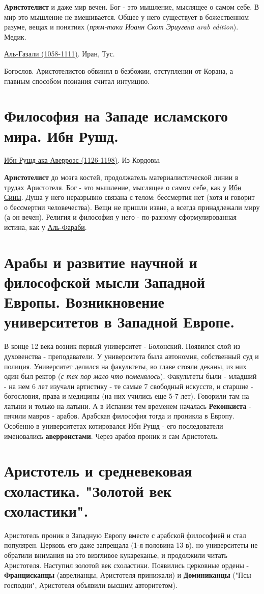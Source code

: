 \documentclass[12pt,a4paper]{article}
\begin{document}
\textbf{Аристотелист} и даже мир вечен. Бог - это мышление, мыслящее о самом себе. В мир это мышление не вмешивается.
Общее у него существует в божественном разуме, вещах и понятиях (\textit{прям-таки Иоанн Скот Эриугена arab edition}). Медик.

\underline{Аль-Газали (1058-1111)}. Иран, Тус.

Богослов. Аристотелистов обвинял в безбожии, отступлении от Корана, а главным способом познания считал интуицию. 

\section{Философия на Западе исламского мира. Ибн Рушд.}

\underline{Ибн Рушд ака Аверроэс (1126-1198)}. Из Кордовы.

\textbf{Аристотелист} до мозга костей, продолжатель материалистической линии в трудах Аристотеля. Бог - это мышление, мыслящее о самом себе, как у \underline{Ибн Сины}. Душа у него неразрывно связана с телом: бессмертия нет (хотя и говорит о бессмертии человечества). Вещи не пришли извне, а всегда принадлежали миру (а он вечен). Религия и философия у него - по-разному сформулированная истина, как у \underline{Аль-Фараби}.


\section{Арабы и развитие научной и философской мысли Западной Европы. Возникновение университетов в Западной Европе.}
В конце 12 века возник первый университет - Болонский. Появился слой из духовенства - преподаватели. У университета была автономия, собственный суд и полиция. Университет делился на факультеты, во главе стояли деканы, из них один был ректор (\textit{с тех пор мало что поменялось}). Факультеты были - младший - на нем 6 лет изучали артистику - те самые 7 свободный искусств, и старшие - богословия, права и медицины (на них учились еще 5-7 лет). Говорили там на латыни и только на латыни. 
А в Испании тем временем началась \textbf{Реконкиста} - пячили мавров - арабов. Арабская философия тогда и проникла в Европу. Особенно в университетах котировался Ибн Рушд - его последователи именовались \textbf{аверроистами}. Через арабов проник и сам Аристотель.

\section{Аристотель и средневековая схоластика. "Золотой век схоластики".}
Аристотель проник в Западную Европу вместе с арабской философией и стал популярен. Церковь его даже запрещала (1-я половина 13 в), но университеты не обратили внимания на это визгливое кукареканье, и продолжили читать Аристотеля. Наступил золотой век схоластики. Появились церковные ордены - \textbf{Францисканцы} (аврелианцы, Аристотеля принижали) и \textbf{Доминиканцы} ("Псы господни", Аристотеля объявили высшим авторитетом).
\end{document}
